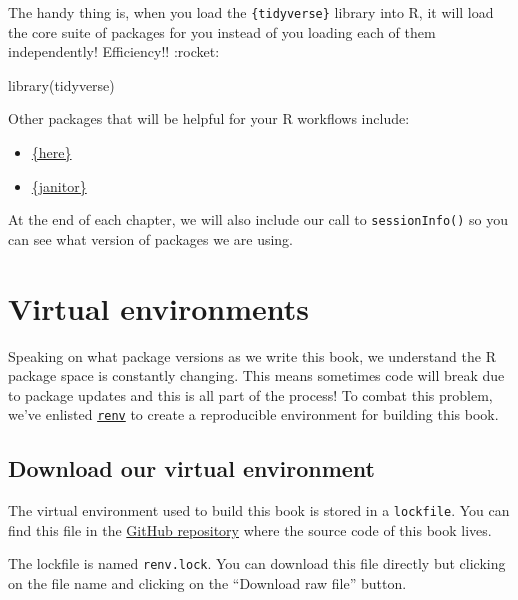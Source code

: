 \documentclass[
  letterpaper,
  DIV=11,
  numbers=noendperiod]{scrreprt}
\newenvironment{Shaded}{\begin{snugshade}}{\end{snugshade}}
\newcommand{\FunctionTok}[1]{\textcolor[rgb]{0.28,0.35,0.67}{#1}}
\newcommand{\NormalTok}[1]{\textcolor[rgb]{0.00,0.23,0.31}{#1}}
\providecommand{\tightlist}{%
  \setlength{\itemsep}{0pt}\setlength{\parskip}{0pt}}\usepackage{longtable,booktabs,array}
\begin{document}
The handy thing is, when you load the \texttt{\{tidyverse\}} library
into R, it will load the core suite of packages for you instead of you
loading each of them independently! Efficiency!! :rocket:

\begin{Shaded}
\begin{Highlighting}[]
\FunctionTok{library}\NormalTok{(tidyverse)}
\end{Highlighting}
\end{Shaded}

Other packages that will be helpful for your R workflows include:

\begin{itemize}
\tightlist
\item
  \href{https://here.r-lib.org/}{\{here\}}\\
\item
  \href{http://sfirke.github.io/janitor/}{\{janitor\}}
\end{itemize}

At the end of each chapter, we will also include our call to
\texttt{sessionInfo()} so you can see what version of packages we are
using.

\section{Virtual environments}\label{virtual-environments}

Speaking on what package versions as we write this book, we understand
the R package space is constantly changing. This means sometimes code
will break due to package updates and this is all part of the process!
To combat this problem, we've enlisted
\href{https://rstudio.github.io/renv/articles/renv.html\#getting-started}{\texttt{renv}}
to create a reproducible environment for building this book.

\subsection{Download our virtual
environment}\label{download-our-virtual-environment}

The virtual environment used to build this book is stored in a
\texttt{lockfile}. You can find this file in the
\href{https://github.com/unsw-edu-au/r4psych}{GitHub repository} where
the source code of this book lives.

The lockfile is named \texttt{renv.lock}. You can download this file
directly but clicking on the file name and clicking on the ``Download
raw file'' button.
\end{document}
